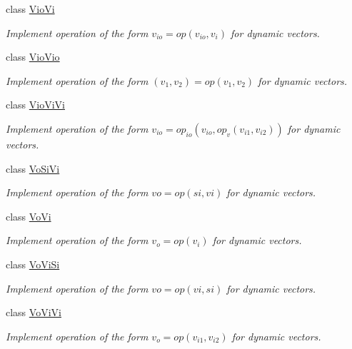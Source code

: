 \begin{DoxyCompactItemize}
class \hyperlink{classvct_dynamic_vector_loop_engines_1_1_vio_vi}{Vio\-Vi}
\begin{DoxyCompactList}\small\item\em Implement operation of the form $v_{io} = op(v_{io}, v_i)$ for dynamic vectors. \end{DoxyCompactList}\item 
class \hyperlink{classvct_dynamic_vector_loop_engines_1_1_vio_vio}{Vio\-Vio}
\begin{DoxyCompactList}\small\item\em Implement operation of the form $(v_{1}, v_{2}) = op(v_{1}, v_{2})$ for dynamic vectors. \end{DoxyCompactList}\item 
class \hyperlink{classvct_dynamic_vector_loop_engines_1_1_vio_vi_vi}{Vio\-Vi\-Vi}
\begin{DoxyCompactList}\small\item\em Implement operation of the form $v_{io} = op_{io}(v_{io}, op_{v}(v_{i1}, v_{i2}))$ for dynamic vectors. \end{DoxyCompactList}\item 
class \hyperlink{classvct_dynamic_vector_loop_engines_1_1_vo_si_vi}{Vo\-Si\-Vi}
\begin{DoxyCompactList}\small\item\em Implement operation of the form $vo = op(si, vi)$ for dynamic vectors. \end{DoxyCompactList}\item 
class \hyperlink{classvct_dynamic_vector_loop_engines_1_1_vo_vi}{Vo\-Vi}
\begin{DoxyCompactList}\small\item\em Implement operation of the form $v_o = op(v_i)$ for dynamic vectors. \end{DoxyCompactList}\item 
class \hyperlink{classvct_dynamic_vector_loop_engines_1_1_vo_vi_si}{Vo\-Vi\-Si}
\begin{DoxyCompactList}\small\item\em Implement operation of the form $vo = op(vi, si)$ for dynamic vectors. \end{DoxyCompactList}\item 
class \hyperlink{classvct_dynamic_vector_loop_engines_1_1_vo_vi_vi}{Vo\-Vi\-Vi}
\begin{DoxyCompactList}\small\item\em Implement operation of the form $v_o = op(v_{i1}, v_{i2})$ for dynamic vectors. \end{DoxyCompactList}\end{DoxyCompactItemize}

